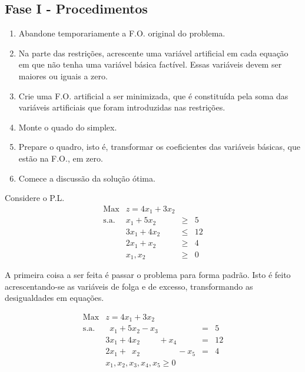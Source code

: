 \subsection{Fase I - Procedimentos} %

\begin{enumerate}
	\item Abandone temporariamente a F.O. original do problema.
 \item Na parte das restrições, acrescente uma variável artificial em cada 
  equação em que não tenha uma variável básica factível.
  Essas variáveis devem ser maiores ou iguais a zero.
 \item Crie uma F.O. artificial a ser minimizada, que é constituída pela soma 
  das variáveis artificiais que foram introduzidas nas restrições.
 \item Monte o quado do simplex.
 \item Prepare o quadro, isto é, transformar os coeficientes das variáveis 
  básicas, que estão na F.O., em zero.
 \item Comece a discussão da solução ótima.
\end{enumerate}

\begin{exemplo}
  Considere o P.L.
  \[
   \begin{array}{rrcl}
    \textrm{Max}  & z = 4x_1 + 3x_2 &      &    \\
    \textrm{s.a.} & x_1 + 5x_2      & \geq & 5  \\
                  & 3x_1 + 4x_2     & \leq & 12 \\ 
                  &     2x_1 + x_2  & \geq & 4  \\ 
                  &     x_1, x_2    & \geq & 0  
   \end{array}
  \]
\end{exemplo}

A primeira coisa a ser feita é passar o problema para forma padrão.
Isto é feito acrescentando-se as variáveis de folga e de excesso, transformando
as desigualdades em equações.

\[
  \begin{array}{rlcl}
   \textrm{Max}  & z = 4x_1 + 3x_2 &                            &    \\
   \textrm{s.a.} & \phantom{3}x_1 +  5x_2 - x_3  \phantom{-0x_4}  \phantom{-0x_5}  & =    & 5  \\
                 &           3x_1 +  4x_2            \phantom{- 0x_3} + x_4 \phantom{- 0x_5}  & =    & 12 \\ 
                 &           2x_1 +  \phantom{0}x_2  \phantom{- 0x_3}  \phantom{+0x_4} - x_5   & =    & 4  \\ 
                 &  x_1, x_2, x_3, x_4, x_5 \geq 0                    &  &   
  \end{array}
\]

